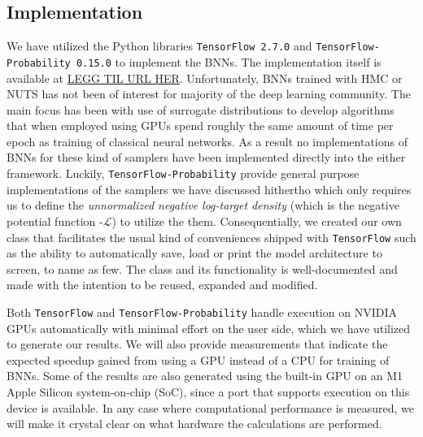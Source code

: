 \subsection{Implementation}
We have utilized the Python libraries {\tt TensorFlow 2.7.0} and {\tt TensorFlow-Probability 0.15.0} to implement the BNNs. 
The implementation itself is available at \url{LEGG TIL URL HER}. Unfortunately, BNNs trained with HMC or NUTS has not been of interest for majority of the deep learning community. The main focus has been with use of surrogate distributions to develop algorithms that when employed using GPUs spend roughly the same amount of time per epoch as training of classical neural networks. As a result no implementations of BNNs for these kind of samplers have been implemented directly into the either framework. Luckily, {\tt TensorFlow-Probability} provide general purpose implementations of the samplers we have discussed hithertho 
which only requires us to define the \textit{unnormalized negative log-target density} (which is the negative potential function -$\mathcal{L}$) to utilize the them. 
Consequentially, we created our own class that facilitates the usual kind of conveniences shipped with {\tt TensorFlow} such as the ability to automatically save, load or print the model architecture to screen, to name as few. The class and its functionality is well-documented and made with the intention to be reused, expanded and modified. 

Both {\tt TensorFlow} and {\tt TensorFlow-Probability} handle execution on NVIDIA GPUs automatically with minimal effort on the user side, which we have utilized to generate our results. We will also provide measurements that indicate the expected speedup gained from using a GPU instead of a CPU for training of BNNs. Some of the results are also generated using the built-in GPU on an M1 Apple Silicon system-on-chip (SoC), since a port that supports execution on this device is available. In any case where computational performance is measured, we will make it crystal clear on what hardware the calculations are performed.
 

